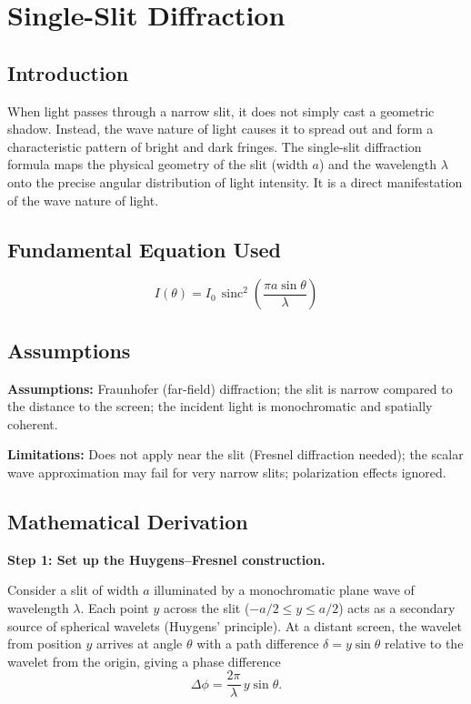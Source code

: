 \chapter{Single-Slit Diffraction}

\section*{Introduction}

When light passes through a narrow slit, it does not simply cast a geometric shadow. Instead, the wave nature of light causes it to spread out and form a characteristic pattern of bright and dark fringes. The single-slit diffraction formula maps the physical geometry of the slit (width $a$) and the wavelength $\lambda$ onto the precise angular distribution of light intensity. It is a direct manifestation of the wave nature of light.
\section*{Fundamental Equation Used}

\begin{equation}
I(\theta) = I_0\,\operatorname{sinc}^2\!\left(\frac{\pi a \sin\theta}{\lambda}\right)
\end{equation}
\section*{Assumptions}

\textbf{Assumptions:} Fraunhofer (far-field) diffraction; the slit is narrow compared to the distance to the screen; the incident light is monochromatic and spatially coherent.


\textbf{Limitations:} Does not apply near the slit (Fresnel diffraction needed); the scalar wave approximation may fail for very narrow slits; polarization effects ignored.


\section*{Mathematical Derivation}

\textbf{Step 1: Set up the Huygens--Fresnel construction.}

Consider a slit of width $a$ illuminated by a monochromatic plane wave of wavelength $\lambda$. Each point $y$ across the slit ($-a/2 \leq y \leq a/2$) acts as a secondary source of spherical wavelets (Huygens' principle). At a distant screen, the wavelet from position $y$ arrives at angle $\theta$ with a path difference $\delta = y\sin\theta$ relative to the wavelet from the origin, giving a phase difference
\begin{equation}
\Delta\phi = \frac{2\pi}{\lambda}\,y\sin\theta.
\end{equation}

